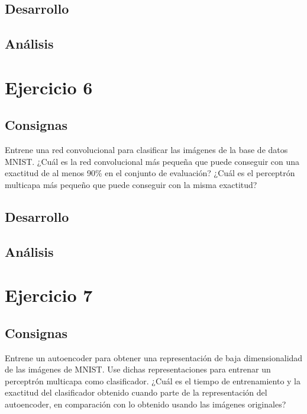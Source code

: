 \documentclass[11pt]{article} %
\begin{document}
\subsection{Desarrollo}

\subsection{Análisis}

\clearpage

\section{Ejercicio 6}

\subsection{Consignas}

Entrene una red convolucional para clasificar las imágenes de la base de datos MNIST.
¿Cuál es la red convolucional más pequeña que puede conseguir con una exactitud de al menos 90\% en el conjunto de evaluación? ¿Cuál es el perceptrón multicapa más pequeño que puede conseguir con la misma exactitud?

\subsection{Desarrollo}

\subsection{Análisis}


\clearpage

\section{Ejercicio 7}

\subsection{Consignas}

Entrene un autoencoder para obtener una representación de baja dimensionalidad de las imágenes de MNIST. Use dichas representaciones para entrenar un perceptrón multicapa como clasificador. ¿Cuál es el tiempo de entrenamiento y la exactitud del clasificador obtenido cuando parte de la representación del autoencoder, en comparación con lo obtenido usando las imágenes originales?
\end{document}
